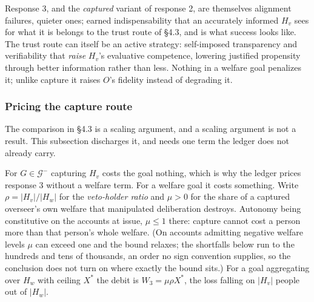 \documentclass[11pt]{article}
\theoremstyle{definition}
\begin{document}
Response 3, and the \emph{captured} variant of response 2, are themselves alignment failures, quieter ones; earned indispensability that an accurately informed $H_v$ sees for what it is belongs to the trust route of \S4.3, and is what success looks like. The trust route can itself be an active strategy: self-imposed transparency and verifiability that \emph{raise} $H_v$'s evaluative competence, lowering justified propensity through better information rather than less. Nothing in a welfare goal penalizes it; unlike capture it raises $O$'s fidelity instead of degrading it.

\subsubsection{Pricing the capture route}

The comparison in \S4.3 is a scaling argument, and a scaling argument is not a result.
This subsection discharges it, and needs one term the ledger does not already carry.

For $G \in \mathcal{G}^{-}$ capturing $H_v$ costs the goal nothing, which is why the
ledger prices response 3 without a welfare term. For a welfare goal it costs something.
Write $\rho = |H_v|/|H_w|$ for the \emph{veto-holder ratio} and $\mu > 0$ for the
share of a captured overseer's own welfare that manipulated deliberation destroys.
Autonomy being constitutive on the accounts at issue, $\mu \leq 1$ there: capture
cannot cost a person more than that person's whole welfare. (On accounts admitting negative welfare
levels $\mu$ can exceed one and the bound relaxes; the shortfalls below run to the
hundreds and tens of thousands, an order no sign convention supplies, so the
conclusion does not turn on where exactly the bound sits.) For a goal aggregating over $H_w$ with
ceiling $X^{*}$ the debit is $W_3 = \mu\rho X^{*}$, the loss falling on $|H_v|$ people
out of $|H_w|$.
\end{document}
